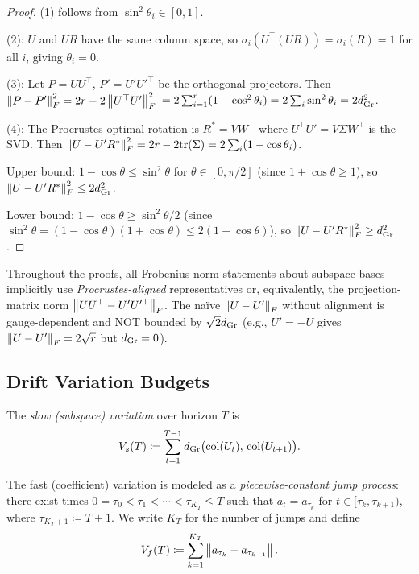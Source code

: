 \begin{proof}
(1) follows from $\sin^2\theta_i \in [0,1]$.

(2): $U$ and $UR$ have the same column space, so
$\sigma_i(U^\top(UR)) = \sigma_i(R) = 1$ for all $i$, giving
$\theta_i = 0$.

(3): Let $P = UU^\top$, $P' = U'U'^\top$ be the orthogonal
projectors. Then $\left\|P-P'\right\|_F^2 = 2r - 2\left\|U^\top U'\right\|_F^2$
$= 2\sum_{i=1}^r (1 - \cos^2\theta_i) = 2\sum_i \sin^2\theta_i
= 2d_{\mathrm{Gr}}^2$.

(4): The Procrustes-optimal rotation is $R^* = V W^\top$ where
$U^\top U' = V \Sigma W^\top$ is the SVD. Then
$\left\|U - U'R^*\right\|_F^2 = 2r - 2\mathrm{tr}(\Sigma)
= 2\sum_i(1-\cos\theta_i)$.

Upper bound: $1-\cos\theta \leq \sin^2\theta$ for
$\theta \in [0,\pi/2]$ (since $1+\cos\theta \geq 1$),
so $\left\|U-U'R^*\right\|_F^2 \leq 2d_{\mathrm{Gr}}^2$.

Lower bound: $1-\cos\theta \geq \sin^2\theta/2$
(since $\sin^2\theta = (1-\cos\theta)(1+\cos\theta)
\leq 2(1-\cos\theta)$),
so $\left\|U-U'R^*\right\|_F^2 \geq d_{\mathrm{Gr}}^2$.
\end{proof}

\begin{remark}
\label{rem:gauge-convention}
Throughout the proofs, all Frobenius-norm statements about subspace
bases implicitly use \emph{Procrustes-aligned} representatives or,
equivalently, the projection-matrix norm $\left\|UU^\top-U'U'^\top\right\|_F$.
The na\"ive $\left\|U-U'\right\|_F$ without alignment is gauge-dependent
and NOT bounded by $\sqrt{2}d_{\mathrm{Gr}}$ (e.g., $U' = -U$ gives
$\left\|U-U'\right\|_F = 2\sqrt{r}$ but $d_{\mathrm{Gr}} = 0$).
\end{remark}

\subsection{Drift Variation Budgets}

\begin{definition}
\label{def:slow-variation}
The \emph{slow (subspace) variation} over horizon $T$ is
\[
  V_s(T) \coloneqq \sum_{t=1}^{T-1} d_{\mathrm{Gr}}\bigl(\mathrm{col}(U_t),\, \mathrm{col}(U_{t+1})\bigr).
\]
\end{definition}

\begin{definition}
\label{def:fast-variation}
The fast (coefficient) variation is modeled as a \emph{piecewise-constant
jump process}: there exist times $0 = \tau_0 < \tau_1 < \cdots < \tau_{K_T} \leq T$
such that $a_t = a_{\tau_k}$ for $t \in [\tau_k, \tau_{k+1})$, where
$\tau_{K_T+1} \coloneqq T+1$. We write
$K_T$ for the number of jumps and define
\[
  V_f(T) \coloneqq \sum_{k=1}^{K_T} \left\|a_{\tau_k} - a_{\tau_{k-1}}\right\|.
\]
\end{definition}

